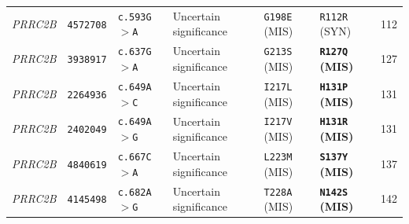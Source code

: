 \documentclass[10pt,letterpaper]{article}
\newcommand{\gene}[1]{\textit{#1}}
\begin{document}
{\begin{longtable}{@{}llllllr@{}}
\gene{PRRC2B} & \texttt{4572708} & \texttt{c.593G$>$A} & Uncertain significance & \texttt{G198E} (MIS) & \texttt{R112R} (SYN) & 112 \\
\gene{PRRC2B} & \texttt{3938917} & \texttt{c.637G$>$A} & Uncertain significance & \texttt{G213S} (MIS) & \textbf{\texttt{R127Q} (MIS)} & 127 \\
\gene{PRRC2B} & \texttt{2264936} & \texttt{c.649A$>$C} & Uncertain significance & \texttt{I217L} (MIS) & \textbf{\texttt{H131P} (MIS)} & 131 \\
\gene{PRRC2B} & \texttt{2402049} & \texttt{c.649A$>$G} & Uncertain significance & \texttt{I217V} (MIS) & \textbf{\texttt{H131R} (MIS)} & 131 \\
\gene{PRRC2B} & \texttt{4840619} & \texttt{c.667C$>$A} & Uncertain significance & \texttt{L223M} (MIS) & \textbf{\texttt{S137Y} (MIS)} & 137 \\
\gene{PRRC2B} & \texttt{4145498} & \texttt{c.682A$>$G} & Uncertain significance & \texttt{T228A} (MIS) & \textbf{\texttt{N142S} (MIS)} & 142 \\
\end{longtable}
}

\newpage
\end{document}
